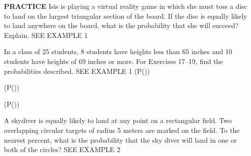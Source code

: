 \documentclass{article}
\newenvironment{practice}[2]{}{}        %
\newcommand{\answer}[1]{}               %
\newcommand{\placeholder}[2]{}          %
\newcommand{\te}[1]{}                   %
\begin{document}
\begin{practice}{16}{2}
\textbf{PRACTICE} Isis is playing a virtual reality game in which she must toss a disc to land on the largest triangular section of the board. If the disc is equally likely to land anywhere on the board, what is the probability that she will succeed? Explain. SEE EXAMPLE 1
\placeholder{diagram}{Virtual reality illustration: gloved hand tossing disc at pale blue rectangular board 50 cm wide and 40 cm high. Largest red triangle spans the entire bottom edge with apex on top edge about two thirds of the way from left. Dimension arrows above and right.}
\answer{0.5, 50\%, or (\frac12); The area of the triangle is half of the area of the rectangle because the rectangle and the triangle have the same base (50 cm) and the same height (40 cm).}
\end{practice}
\begin{practice}{17}{1}
In a class of 25 students, 8 students have heights less than 65 inches and 10 students have heights of 69 inches or more. For Exercises 17--19, find the probabilities described. SEE EXAMPLE 1
(P())
\answer{0.72 or 72\%}
\te{Printed greater than 69 differs from the given 69 inches or more; the answer includes all ten students in the latter group.}
\end{practice}
\begin{practice}{18}{1}
(P())
\answer{0.68 or 68\%}
\end{practice}
\begin{practice}{19}{1}
(P())
\answer{0.28 or 28\%}
\te{Printed upper bound includes 69 inches, while the answer excludes all ten students whose heights are 69 inches or more.}
\end{practice}
\begin{practice}{20}{2}
A skydiver is equally likely to land at any point on a rectangular field. Two overlapping circular targets of radius 5 meters are marked on the field. To the nearest percent, what is the probability that the sky diver will land in one or both of the circles? SEE EXAMPLE 2
\placeholder{diagram}{Green rectangular field 30 m wide and 20 m high, dimension arrows top and left. Two horizontally overlapping circles near upper left, each radius 5 m labeled along horizontal radius. Callout arrow to lens-shaped overlap labels 30 m². Skydiver at upper right.}
\answer{21\%}
\end{practice}
\end{document}
